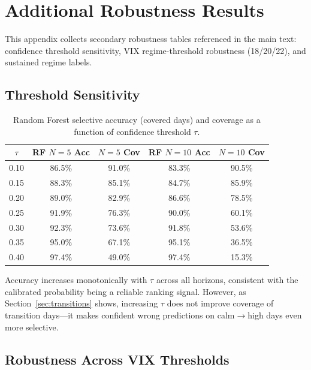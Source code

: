 \documentclass[12pt]{article}
\begin{document}
\section{Additional Robustness Results}
\label{app:robustness}

This appendix collects secondary robustness tables referenced in the main text: confidence
threshold sensitivity, VIX regime-threshold robustness (18/20/22), and sustained regime
labels.

\subsection{Threshold Sensitivity}

\begin{table}[H]
\centering
\caption{Random Forest selective accuracy (covered days) and coverage as a function of
confidence threshold $\tau$.}
\label{tab:threshold}
\begin{tabular}{ccccc}
\toprule
$\tau$ & RF $N{=}5$ Acc & $N{=}5$ Cov & RF $N{=}10$ Acc & $N{=}10$ Cov \\
\midrule
0.10 & 86.5\% & 91.0\% & 83.3\% & 90.5\% \\
0.15 & 88.3\% & 85.1\% & 84.7\% & 85.9\% \\
0.20 & 89.0\% & 82.9\% & 86.6\% & 78.5\% \\
0.25 & 91.9\% & 76.3\% & 90.0\% & 60.1\% \\
0.30 & 92.3\% & 73.6\% & 91.8\% & 53.6\% \\
0.35 & 95.0\% & 67.1\% & 95.1\% & 36.5\% \\
0.40 & 97.4\% & 49.0\% & 97.4\% & 15.3\% \\
\bottomrule
\end{tabular}
\end{table}

Accuracy increases monotonically with $\tau$ across all horizons, consistent with the
calibrated probability being a reliable ranking signal. However, as Section~\ref{sec:transitions} shows,
increasing $\tau$ does not improve coverage of transition days---it makes confident wrong
predictions on calm$\to$high days even more selective.

\subsection{Robustness Across VIX Thresholds}
\end{document}
